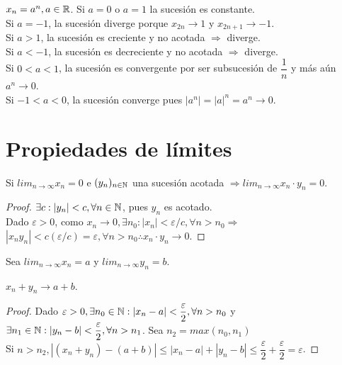 \begin{eg}
  $x_n = a^n, a \in \mathbb{R}$. Si $a=0$ o $a = 1$ la sucesión es constante. \\
  Si $a = -1$, la sucesión diverge porque $x_{2n} \to 1$ y $x_{2n+1} \to -1$. \\
  Si $a > 1$, la sucesión es creciente y no acotada $\Rightarrow$ diverge. \\
  Si $a < -1$, la sucesión es decreciente y no acotada $\Rightarrow$ diverge. \\
  Si $0 < a < 1$, la sucesión es convergente por ser subsucesión de $\dfrac{1}{n}$ y más aún $a^n \to 0$. \\
  Si $-1 < a < 0$, la sucesión converge pues $|a^n| = |a|^n = a^n \to 0$.
\end{eg}

\section{Propiedades de límites}

\begin{theorem}
  Si $lim_{n \to \infty} x_n = 0$ e $(y_n)_{n \in \mathbb{N}}$ una sucesión acotada $\Rightarrow lim_{n \to \infty} x_n \cdot y_n = 0$.
  \begin{proof}
    $\exists c : |y_n| < c, \forall n \in \mathbb{N}$, pues $y_n$ es acotado. \\
    Dado $\varepsilon > 0$, como $x_n \to 0, \exists n_0 : |x_n| < \varepsilon/c, \forall n > n_0 \Rightarrow$ \\
    $|x_n y_n| < c (\varepsilon/c) = \varepsilon, \forall n > n_0 \therefore x_n \cdot y_n \to 0$.
  \end{proof}
\end{theorem}

Sea $lim_{n \to \infty} x_n = a$ y $lim_{n \to \infty} y_n = b$.

\begin{prop}
  $x_n + y_n \to a+b$.
  \begin{proof}
    Dado $\varepsilon > 0, \exists n_0 \in \mathbb{N} : |x_n - a| < \dfrac{\varepsilon}{2}, \forall n > n_0$ y \\ $\exists n_1 \in \mathbb{N} : |y_n - b| < \dfrac{\varepsilon}{2}, \forall n > n_1$.
    Sea $n_2 = max(n_0, n_1)$ \\
    Si $n > n_2, |(x_n + y_n)-(a + b)| \leq |x_n - a| + |y_n - b| \leq \dfrac{\varepsilon}{2} + \dfrac{\varepsilon}{2} = \varepsilon$.
  \end{proof}
\end{prop}

